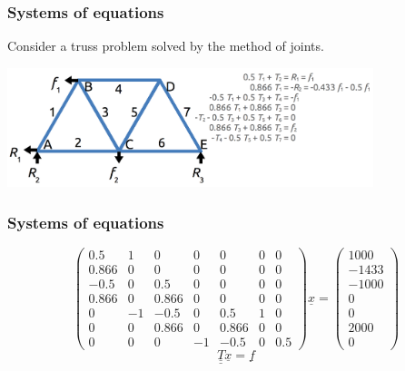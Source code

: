 \documentclass[11pt]{beamer}
\begin{document}
\begin{frame}[fragile]
  \frametitle{Systems of equations}
  \Enlarge

  \begin{enumerate}
  \myitem  Consider a truss problem solved by the method of joints.
  \end{enumerate}
  \includegraphics[width=0.8\textwidth]{img/truss-graphic.png}
\end{frame}

\begin{frame}[fragile]
  \frametitle{Systems of equations}

  $$
\left( \begin{array}{ccccccc}
  0.5 & 1 & 0 & 0 & 0 & 0 & 0 \\
  0.866 & 0 & 0 & 0 & 0 & 0 & 0 \\
  -0.5 & 0 & 0.5 & 0 & 0 & 0 & 0 \\
  0.866 & 0 & 0.866 & 0 & 0 & 0 & 0 \\
  0 & -1 & -0.5 & 0 & 0.5 & 1 & 0 \\
  0 & 0 & 0.866 & 0 & 0.866 & 0 & 0 \\
  0 & 0 & 0 & -1 & -0.5 & 0 & 0.5
\end{array} \right)
\underline{x}
=
\left( \begin{array}{c}
  1000 \\
  -1433 \\
  -1000 \\
  0 \\
  0 \\
  2000 \\
  0
\end{array} \right)
  $$
  $$
\underline{\underline{T}} \underline{x} = \underline{f}
  $$
\end{frame}
\end{document}

